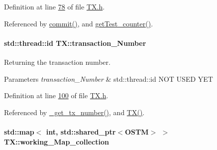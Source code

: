Definition at line \hyperlink{_t_x_8h_source_l00078}{78} of file \hyperlink{_t_x_8h_source}{T\+X.\+h}.



Referenced by \hyperlink{_t_x_8cpp_source_l00202}{commit()}, and \hyperlink{_t_x_8cpp_source_l00324}{get\+Test\+\_\+counter()}.

\paragraph[{\texorpdfstring{transaction\+\_\+\+Number}{transaction_Number}}]{\setlength{\rightskip}{0pt plus 5cm}std\+::thread\+::id T\+X\+::transaction\+\_\+\+Number\hspace{0.3cm}{\ttfamily [private]}}\hypertarget{class_t_x_a145a1c74b521f277fe481971a930b249_a145a1c74b521f277fe481971a930b249}{}\label{class_t_x_a145a1c74b521f277fe481971a930b249_a145a1c74b521f277fe481971a930b249}


Returning the transaction number. 


\begin{DoxyParams}{Parameters}
{\em transaction\+\_\+\+Number} & std\+::thread\+::id N\+OT U\+S\+ED Y\+ET \\
\hline
\end{DoxyParams}


Definition at line \hyperlink{_t_x_8h_source_l00100}{100} of file \hyperlink{_t_x_8h_source}{T\+X.\+h}.



Referenced by \hyperlink{_t_x_8cpp_source_l00331}{\+\_\+get\+\_\+tx\+\_\+number()}, and \hyperlink{_t_x_8cpp_source_l00031}{T\+X()}.

\paragraph[{\texorpdfstring{working\+\_\+\+Map\+\_\+collection}{working_Map_collection}}]{\setlength{\rightskip}{0pt plus 5cm}std\+::map$<$ int, std\+::shared\+\_\+ptr$<${\bf O\+S\+TM}$>$ $>$ T\+X\+::working\+\_\+\+Map\+\_\+collection\hspace{0.3cm}{\ttfamily [private]}}\hypertarget{class_t_x_a81aafda16e2f20e36ec6c68e584668ff_a81aafda16e2f20e36ec6c68e584668ff}{}\label{class_t_x_a81aafda16e2f20e36ec6c68e584668ff_a81aafda16e2f20e36ec6c68e584668ff}


